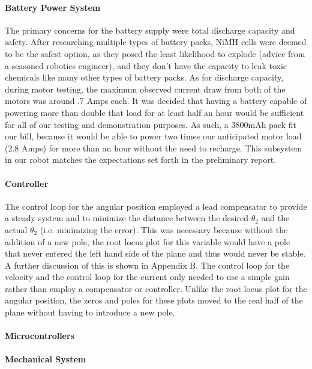 \documentclass[11pt]{report}
\begin{document}
\begin{spacing}{1.5}
        \paragraph{Battery Power System}
        
        The primary concerns for the battery supply were total discharge capacity and safety. After researching multiple types of battery packs, NiMH cells were deemed to be the safest option, as they posed the least likelihood to explode (advice from a seasoned robotics engineer), and they don’t have the capacity to leak toxic chemicals like many other types of battery packs. As for discharge capacity, during motor testing, the maximum observed current draw from both of the motors was around .7 Amps each. It was decided that having a battery capable of powering more than double that load for at least half an hour would be sufficient for all of our testing and demonstration purposes. As such, a 3800mAh pack fit our bill, because it would be able to power two times our anticipated motor load (2.8 Amps) for more than an hour without the need to recharge. This subsystem in our robot matches the expectations set forth in the preliminary report.
        
        \paragraph{Controller}
        
        The control loop for the angular position employed a lead compensator to provide a steady system and to minimize the distance between the desired $\theta_2$ and the actual $\theta_2$ (i.e. minimizing the error).  This was necessary because without the addition of a new pole, the root locus plot for this variable would have a pole that never entered the left hand side of the plane and thus would never be stable.  A further discussion of this is shown in Appendix B.  The control loop for the velocity and the control loop for the current only needed to use a simple gain rather than employ a compensator or controller.  Unlike the root locus plot for the angular position, the zeros and poles for these plots moved to the real half of the plane without having to introduce a new pole.  
        
        
        \paragraph{Microcontrollers}
        
        \paragraph{Mechanical System}
        

\end{spacing}
\end{document}
